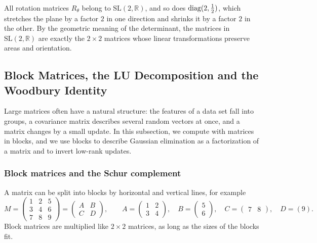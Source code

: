 \begin{example}
    All rotation matrices $R_\theta$ belong to $\mathrm{SL}(2, \mathbb{R})$, and so does $\operatorname{diag}(2, \frac{1}{2})$, which stretches the plane by a factor $2$ in one direction and shrinks it by a factor $2$ in the other. By the geometric meaning of the determinant, the matrices in $\mathrm{SL}(2, \mathbb{R})$ are exactly the $2 \times 2$ matrices whose linear transformations preserve areas and orientation.
\end{example}

\subsection{Block Matrices, the LU Decomposition and the Woodbury Identity}\label{L1-subsec:block}

Large matrices often have a natural structure: the features of a data set fall into groups, a covariance matrix describes several random vectors at once, and a matrix changes by a small update. In this subsection, we compute with matrices in blocks, and we use blocks to describe Gaussian elimination as a factorization of a matrix and to invert low-rank updates.

\subsubsection{Block matrices and the Schur complement}

A matrix can be split into blocks by horizontal and vertical lines, for example
\[M = \left(\begin{array}{cc|c}
    1 & 2 & 5 \\
    3 & 4 & 6 \\ \hline
    7 & 8 & 9
\end{array}\right) = \begin{pmatrix} A & B \\ C & D \end{pmatrix}, \qquad A = \begin{pmatrix} 1 & 2 \\ 3 & 4 \end{pmatrix}, \quad B = \begin{pmatrix} 5 \\ 6 \end{pmatrix}, \quad C = \begin{pmatrix} 7 & 8 \end{pmatrix}, \quad D = (9).\]
Block matrices are multiplied like $2 \times 2$ matrices, as long as the sizes of the blocks fit.

